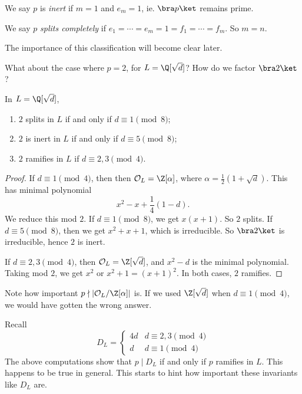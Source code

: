 \documentclass[a4paper]{article}
\begin{document}
\begin{defi}
  We say $p$ is \emph{inert} if $m = 1$ and $e_m = 1$, ie. $\bra p\ket$ remains prime.
\end{defi}

\begin{defi}
  We say $p$ \emph{splits completely} if $e_1 = \cdots = e_m = 1 = f_1 = \cdots = f_m$. So $m = n$.
\end{defi}
The importance of this classification will become clear later.

What about the case where $p = 2$, for $L = \Q[\sqrt{d}]$? How do we factor $\bra 2\ket$?

\begin{lemma}
  In $L = \Q[\sqrt{d}]$,
  \begin{enumerate}
    \item $2$ splits in $L$ if and only if $d \equiv 1 \pmod 8$;
    \item $2$ is inert in $L$ if and only if $d \equiv 5 \pmod 8$;
    \item $2$ ramifies in $L$ if $d \equiv 2, 3\pmod 4$.
  \end{enumerate}
\end{lemma}

\begin{proof}
  If $d \equiv 1 \pmod 4$, then then $\mathcal{O}_L = \Z[\alpha]$, where $\alpha = \frac{1}{2}(1 + \sqrt{d})$. This has minimal polynomial
  \[
    x^2 - x + \frac{1}{4}(1 - d).
  \]
  We reduce this mod $2$. If $d \equiv 1\pmod 8$, we get $x(x + 1)$. So $2$ splits. If $d \equiv 5 \pmod 8$, then we get $x^2 + x + 1$, which is irreducible. So $\bra 2\ket$ is irreducible, hence $2$ is inert.

  If $d \equiv 2, 3\pmod 4$, then $\mathcal{O}_L = \Z[\sqrt{d}]$, and $x^2 - d$ is the minimal polynomial. Taking mod $2$, we get $x^2$ or $x^2 + 1 = (x + 1)^2$. In both cases, $2$ ramifies.
\end{proof}

Note how important $p \nmid |\mathcal{O}_L/\Z[\alpha]|$ is. If we used $\Z[\sqrt{d}]$ when $d \equiv 1 \pmod 4$, we would have gotten the wrong answer.

Recall
\[
  D_L =
  \begin{cases}
    4d & d \equiv 2, 3\pmod 4\\
    d & d \equiv 1 \pmod 4
  \end{cases}
\]
The above computations show that $p \mid D_L$ if and only if $p$ ramifies in $L$. This happens to be true in general. This starts to hint how important these invariants like $D_L$ are.
\end{document}
